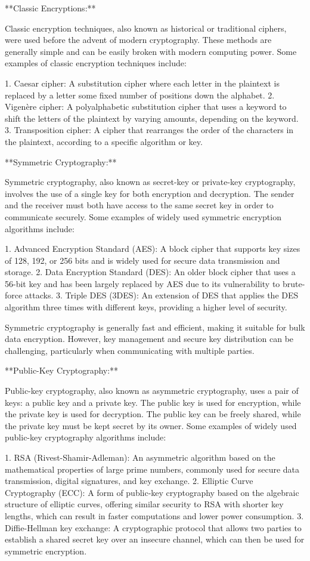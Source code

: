 \documentclass{article}
\begin{document}
**Classic Encryptions:**

Classic encryption techniques, also known as historical or traditional ciphers, were used before the advent of modern cryptography. These methods are generally simple and can be easily broken with modern computing power. Some examples of classic encryption techniques include:

1. Caesar cipher: A substitution cipher where each letter in the plaintext is replaced by a letter some fixed number of positions down the alphabet.
2. Vigenère cipher: A polyalphabetic substitution cipher that uses a keyword to shift the letters of the plaintext by varying amounts, depending on the keyword.
3. Transposition cipher: A cipher that rearranges the order of the characters in the plaintext, according to a specific algorithm or key.

**Symmetric Cryptography:**

Symmetric cryptography, also known as secret-key or private-key cryptography, involves the use of a single key for both encryption and decryption. The sender and the receiver must both have access to the same secret key in order to communicate securely. Some examples of widely used symmetric encryption algorithms include:

1. Advanced Encryption Standard (AES): A block cipher that supports key sizes of 128, 192, or 256 bits and is widely used for secure data transmission and storage.
2. Data Encryption Standard (DES): An older block cipher that uses a 56-bit key and has been largely replaced by AES due to its vulnerability to brute-force attacks.
3. Triple DES (3DES): An extension of DES that applies the DES algorithm three times with different keys, providing a higher level of security.

Symmetric cryptography is generally fast and efficient, making it suitable for bulk data encryption. However, key management and secure key distribution can be challenging, particularly when communicating with multiple parties.

**Public-Key Cryptography:**

Public-key cryptography, also known as asymmetric cryptography, uses a pair of keys: a public key and a private key. The public key is used for encryption, while the private key is used for decryption. The public key can be freely shared, while the private key must be kept secret by its owner. Some examples of widely used public-key cryptography algorithms include:

1. RSA (Rivest-Shamir-Adleman): An asymmetric algorithm based on the mathematical properties of large prime numbers, commonly used for secure data transmission, digital signatures, and key exchange.
2. Elliptic Curve Cryptography (ECC): A form of public-key cryptography based on the algebraic structure of elliptic curves, offering similar security to RSA with shorter key lengths, which can result in faster computations and lower power consumption.
3. Diffie-Hellman key exchange: A cryptographic protocol that allows two parties to establish a shared secret key over an insecure channel, which can then be used for symmetric encryption.
\end{document}
